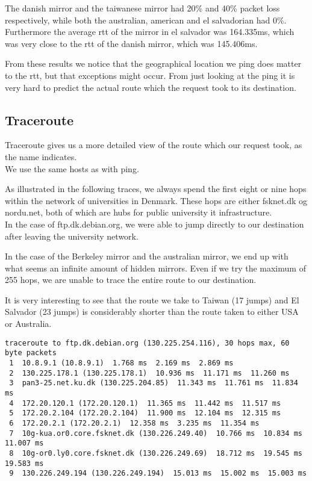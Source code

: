 \documentclass{acm_proc_article-sp}
\begin{document}
The danish mirror and the taiwanese mirror had 20\% and 40\% packet loss respectively, while both the australian, american and el salvadorian had 0\%.\\
Furthermore the average rtt of the mirror in el salvador was 164.335ms, which was very close to the rtt of the danish mirror, which was 145.406ms.

From these results we notice that the geographical location we ping does matter to the rtt, but that exceptions might occur. From just looking at the ping it is very hard to predict the actual route which the request took to its destination.

\onecolumn

\subsection{Traceroute}

Traceroute gives us a more detailed view of the route which our request took, as the name indicates.\\
We use the same hosts as with ping.

As illustrated in the following traces, we always spend the first eight or nine hops within the network of universities in Denmark. These hops are either fsknet.dk og nordu.net, both of which are hubs for public university it infrastructure.\\
In the case of ftp.dk.debian.org, we were able to jump directly to our destination after leaving the university network.

In the case of the Berkeley mirror and the australian mirror, we end up with what seems an infinite amount of hidden mirrors. Even if we try the maximum of 255 hops, we are unable to trace the entire route to our destination.

It is very interesting to see that the route we take to Taiwan (17 jumps) and El Salvador (23 jumps) is considerably shorter than the route taken to either USA or Australia. 

\begin{lstlisting}
traceroute to ftp.dk.debian.org (130.225.254.116), 30 hops max, 60 byte packets
 1  10.8.9.1 (10.8.9.1)  1.768 ms  2.169 ms  2.869 ms
 2  130.225.178.1 (130.225.178.1)  10.936 ms  11.171 ms  11.260 ms
 3  pan3-25.net.ku.dk (130.225.204.85)  11.343 ms  11.761 ms  11.834 ms
 4  172.20.120.1 (172.20.120.1)  11.365 ms  11.442 ms  11.517 ms
 5  172.20.2.104 (172.20.2.104)  11.900 ms  12.104 ms  12.315 ms
 6  172.20.2.1 (172.20.2.1)  12.358 ms  3.235 ms  11.354 ms
 7  10g-kua.or0.core.fsknet.dk (130.226.249.40)  10.766 ms  10.834 ms  11.007 ms
 8  10g-or0.ly0.core.fsknet.dk (130.226.249.69)  18.712 ms  19.545 ms  19.583 ms
 9  130.226.249.194 (130.226.249.194)  15.013 ms  15.002 ms  15.003 ms
\end{lstlisting}
\end{document}
